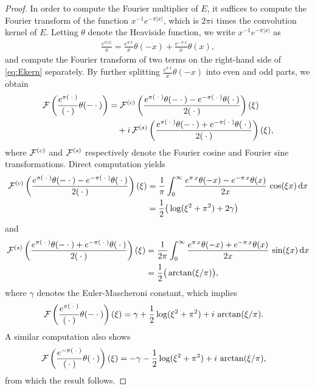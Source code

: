 \documentclass[../dissertation.tex]{subfiles}
\begin{document}
\begin{proof}
	In order to compute the Fourier multiplier of $E$, it suffices to compute the Fourier
	transform of the function $x^{-1} e^{-\pi|x|}$, which is $2\pi i$ times the 
	convolution kernel of $E$. Letting $\theta$ denote the Heaviside function, we 
	write $x^{-1} e^{-\pi|x|}$ as 
	\begin{align}\label{eq:Ekern}
		\frac{e^{\pi |x|}}{x} 
			=
			\frac{e^{\pi \, x}}{x} \theta(-x) + \frac{e^{-\pi \, x}}{x} \theta(x),
	\end{align}
	and compute the Fourier transform of two terms on the right-hand side of 
	\eqref{eq:Ekern} separately. By further splitting $\frac{e^{\pi \, x}}{x} \theta(-x)$
	into even and odd parts, we obtain
	\begin{align}
		\mathcal F\left( \frac{e^{\pi (\kern 0.5ex \cdot \kern 0.5ex)}}{(\kern 0.5ex \cdot \kern 0.5ex)} \theta(-\kern 0.5ex \cdot \kern 0.5ex) \right)
			&= \mathcal F^{(c)} \left( 
					\frac{e^{\pi (\kern 0.5ex \cdot \kern 0.5ex)}\theta(-\kern 0.5ex \cdot \kern 0.5ex)-e^{-\pi(\kern 0.5ex \cdot \kern 0.5ex)}\theta(\kern 0.5ex \cdot \kern 0.5ex)}
						{2(\kern 0.5ex \cdot \kern 0.5ex)}  
				\right)(\xi)
				\\
			&\quad + i \, \mathcal F^{(s)} \left(
					\frac{e^{\pi(\kern 0.5ex \cdot \kern 0.5ex)}\theta(-\kern 0.5ex \cdot \kern 0.5ex)+e^{-\pi(\kern 0.5ex \cdot \kern 0.5ex)}\theta(\kern 0.5ex \cdot \kern 0.5ex)}
						{2(\kern 0.5ex \cdot \kern 0.5ex)} 
				\right)(\xi),
				\nonumber
	\end{align}
	where $\mathcal F^{(c)}$ and $\mathcal F^{(s)}$ respectively denote the Fourier cosine and
	Fourier sine transformations. Direct computation yields 
	\begin{align*}
		\mathcal F^{(c)} \left( 
			\frac{e^{\pi (\kern 0.5ex \cdot \kern 0.5ex)}\theta(-\kern 0.5ex \cdot \kern 0.5ex)-e^{-\pi(\kern 0.5ex \cdot \kern 0.5ex)}\theta(\kern 0.5ex \cdot \kern 0.5ex)}
				{2(\kern 0.5ex \cdot \kern 0.5ex)}  
		\right)(\xi)
			&= \frac{1}{\pi}
				\int_0^\infty 
					\frac{e^{\pi \,x}\theta(-x)-e^{-\pi\,x}\theta(x)}{2x}
				\, \cos(\xi x) \, \mathrm{d}x 
				\\
			&= \frac{1}{2} \big(
					\log(\xi^2 + \pi^2) + 2 \gamma
				\big)
				\nonumber
	\end{align*}
	and 
	\begin{align*}
		\mathcal F^{(s)} \left( 
			\frac{e^{\pi (\kern 0.5ex \cdot \kern 0.5ex)}\theta(-\kern 0.5ex \cdot \kern 0.5ex)+e^{-\pi(\kern 0.5ex \cdot \kern 0.5ex)}\theta(\kern 0.5ex \cdot \kern 0.5ex)}
				{2(\kern 0.5ex \cdot \kern 0.5ex)}  
		\right)(\xi)
			&= \frac{1}{2\pi} 
				\int_0^\infty 
					\frac{e^{\pi \,x}\theta(-x)+e^{-\pi\,x}\theta(x)}{2x}
				\, \sin(\xi x) \, \mathrm{d}x 
				\\
			&= \frac{1}{2} \big(
					\arctan(\xi/\pi)
				\big),
				\nonumber
	\end{align*}
	where $\gamma$ denotes the Euler-Mascheroni constant, which implies
	\begin{align}
		\mathcal F \left( 
			 \frac{e^{\pi (\kern 0.5ex \cdot \kern 0.5ex)}}{(\kern 0.5ex \cdot \kern 0.5ex)} \theta(-\kern 0.5ex \cdot \kern 0.5ex)
		\right)(\xi)
			&=
				\gamma
				+ \frac{1}{2} \log(\xi^2 + \pi^2) 
				+ i \, \arctan(\xi/\pi).
	\end{align}
	A similar computation also shows 
	\begin{align}
		\mathcal F \left( 
			 \frac{e^{-\pi (\kern 0.5ex \cdot \kern 0.5ex)}}{(\kern 0.5ex \cdot \kern 0.5ex)} \theta(\kern 0.5ex \cdot \kern 0.5ex)
		\right)(\xi)
			&= 
				- \gamma
				- \frac{1}{2} \log(\xi^2 + \pi^2) 
				+ i \, \arctan(\xi/\pi),
	\end{align}
	from which the result follows.
\end{proof}
\end{document}

